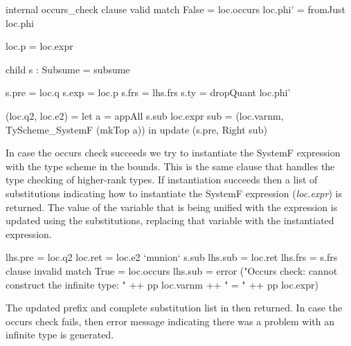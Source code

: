 \begin{code}
internal occurs_check
  clause valid
    match False = loc.occurs
    loc.phi' = fromJust loc.phi
    
    loc.p = loc.expr
    
    child s : Subsume = subsume
    
    s.pre = loc.q
    s.exp = loc.p
    s.frs = lhs.frs
    s.ty  = dropQuant loc.phi'
    
    (loc.q2, loc.e2) = let a   = appAll s.sub loc.expr
                           sub = (loc.varnm, TyScheme_SystemF (mkTop a))
                       in update (s.pre, Right sub)
\end{code}
In case the occurs check succeeds we try to instantiate the SystemF expression with the type scheme in the bounds. This is the same clause that handles the type checking of higher-rank types. If instantiation succeeds then a list of substitutions indicating how to instantiate the SystemF expression (\emph{loc.expr}) is returned.
The value of the variable that is being unified with the expression is updated using the substitutions, replacing that variable with the instantiated expression.

\begin{code}
  lhs.pre = loc.q2
  loc.ret = loc.e2 `munion` s.sub
  lhs.sub = loc.ret
  lhs.frs = s.frs  
clause invalid
  match True = loc.occurs
  lhs.sub = error ("Occurs check: cannot construct the infinite type: " ++ pp loc.varnm ++ " = " ++ pp loc.expr)
\end{code}
The updated prefix and complete substitution list in then returned. In case the occurs check fails, then error message indicating there was a problem with an infinite type is generated.

